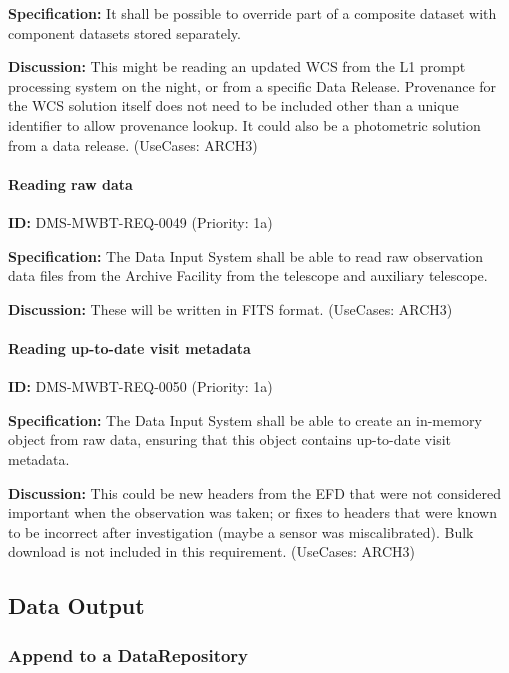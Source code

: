 \documentclass[SE,toc,lsstdraft]{lsstdoc}
\begin{document}
\textbf{Specification:}
It shall be possible to override part of a composite dataset with component datasets stored separately.

\textbf{Discussion:}
This might be reading an updated WCS from the L1 prompt processing system on the night, or from a specific Data Release. Provenance for the WCS solution itself does not need to be included other than a unique identifier to allow provenance lookup. It could also be a photometric solution from a data release. (UseCases: ARCH3)

\paragraph{Reading raw data}\hfill  %

\label{DMS-MWBT-REQ-0049}
\textbf{ID:} DMS-MWBT-REQ-0049 (Priority: 1a)

\textbf{Specification:}
The Data Input System shall be able to read raw observation data files from the Archive Facility from the telescope and auxiliary telescope.

\textbf{Discussion:}
These will be written in FITS format. (UseCases: ARCH3)

\paragraph{Reading up-to-date visit metadata}\hfill  %

\label{DMS-MWBT-REQ-0050}
\textbf{ID:} DMS-MWBT-REQ-0050 (Priority: 1a)

\textbf{Specification:}
The Data Input System shall be able to create an in-memory object from raw data, ensuring that this object contains up-to-date visit metadata.

\textbf{Discussion:}
This could be new headers from the EFD that were not considered important when the observation was taken; or fixes to headers that were known to be incorrect after investigation (maybe a sensor was miscalibrated). Bulk download is not included in this requirement. (UseCases: ARCH3)

\subsection{Data Output}

\subsubsection{Append to a DataRepository}
\end{document}
